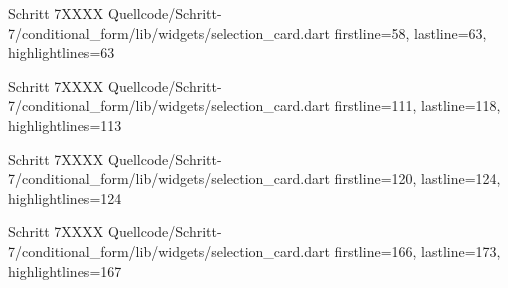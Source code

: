 \begin{alexlisting}{Schritt 7}{XXXX}
    {Quellcode/Schritt-7/conditional_form/lib/widgets/selection_card.dart}
    {firstline=58, lastline=63, highlightlines={63}}
    \label{lst:Schritt7XXXX}
\end{alexlisting}

\begin{alexlisting}{Schritt 7}{XXXX}
    {Quellcode/Schritt-7/conditional_form/lib/widgets/selection_card.dart}
    {firstline=111, lastline=118, highlightlines={113}}
    \label{lst:Schritt7XXXX}
\end{alexlisting}

\begin{alexlisting}{Schritt 7}{XXXX}
    {Quellcode/Schritt-7/conditional_form/lib/widgets/selection_card.dart}
    {firstline=120, lastline=124, highlightlines={124}}
    \label{lst:Schritt7XXXX}
\end{alexlisting}

\begin{alexlisting}{Schritt 7}{XXXX}
    {Quellcode/Schritt-7/conditional_form/lib/widgets/selection_card.dart}
    {firstline=166, lastline=173, highlightlines={167}}
    \label{lst:Schritt7XXXX}
\end{alexlisting}

\ifincludeall \clearpage \fi 
